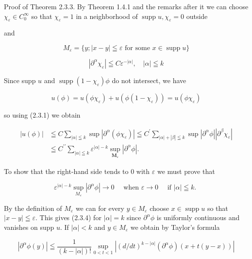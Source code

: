 Proof of Theorem 2.3.3. By Theorem 1.4.1 and the remarks after it we can choose $\chi_{\varepsilon} \in C_{0}^{\infty}$ so that $\chi_{\varepsilon}=1$ in a neighborhood of $\operatorname{supp} u, \chi_{\varepsilon}=0$ outside

and

\[
M_{\varepsilon}=\{y ;|x-y| \leqq \varepsilon \text { for some } x \in \operatorname{supp} u\}
\]

\[
\left|\partial^{\alpha} \chi_{\varepsilon}\right| \leqq C \varepsilon^{-|\alpha|}, \quad|\alpha| \leqq k
\]

Since supp $u$ and $\operatorname{supp}\left(1-\chi_{\varepsilon}\right) \phi$ do not intersect, we have

\[
u(\phi)=u\left(\phi \chi_{\varepsilon}\right)+u\left(\phi\left(1-\chi_{\varepsilon}\right)\right)=u\left(\phi \chi_{\varepsilon}\right)
\]

so using (2.3.1) we obtain

\[
\begin{aligned}
|u(\phi)| & \leqq C \sum_{|\alpha| \leqq k} \sup \left|\partial^{\alpha}\left(\phi \chi_{\varepsilon}\right)\right| \leqq C^{\prime} \sum_{|\alpha|+|\beta| \leqq k} \sup \left|\partial^{\alpha} \phi\right|\left|\partial^{\beta} \chi_{\varepsilon}\right| \\
& \leqq C^{\prime \prime} \sum_{|\alpha| \leqq k} \varepsilon^{|\alpha|-k} \sup _{\boldsymbol{M}_{\varepsilon}}\left|\partial^{\alpha} \phi\right| .
\end{aligned}
\]

To show that the right-hand side tends to 0 with $\varepsilon$ we must prove that


\begin{equation*}
\varepsilon^{|\alpha|-k} \sup _{M_{\varepsilon}}\left|\partial^{\alpha} \phi\right| \rightarrow 0 \quad \text { when } \varepsilon \rightarrow 0 \quad \text { if }|\alpha| \leqq k \text {. } \tag{2.3.4}
\end{equation*}


By the definition of $M_{\varepsilon}$ we can for every $y \in M_{\varepsilon}$ choose $x \in \operatorname{supp} u$ so that $|x-y| \leqq \varepsilon$. This gives (2.3.4) for $|\alpha|=k$ since $\partial^{\alpha} \phi$ is uniformly continuous and vanishes on supp $u$. If $|\alpha|<k$ and $y \in M_{\varepsilon}$ we obtain by Taylor's formula

\[
\left|\partial^{\alpha} \phi(y)\right| \leqq \frac{1}{(k-|\alpha|) !} \sup _{0<t<1}\left|(d / d t)^{k-|\alpha|}\left(\partial^{\alpha} \phi\right)(x+t(y-x))\right|
\]

